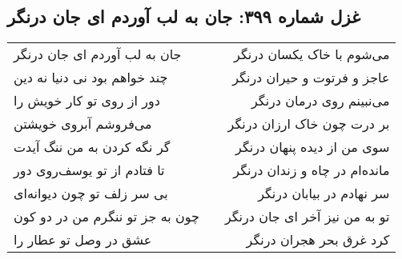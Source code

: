 \begin{center}
\section*{غزل شماره ۳۹۹: جان به لب آوردم ای جان درنگر}
\label{sec:399}
\begin{longtable}{l p{0.5cm} r}
جان به لب آوردم ای جان درنگر
&&
می‌شوم با خاک یکسان درنگر
\\
چند خواهم بود نی دنیا نه دین
&&
عاجز و فرتوت و حیران درنگر
\\
دور از روی تو کار خویش را
&&
می‌نبینم روی درمان درنگر
\\
می‌فروشم آبروی خویشتن
&&
بر درت چون خاک ارزان درنگر
\\
گر نگه کردن به من ننگ آیدت
&&
سوی من از دیده پنهان درنگر
\\
تا فتادم از تو یوسف‌روی دور
&&
مانده‌ام در چاه و زندان درنگر
\\
بی سر زلف تو چون دیوانه‌ای
&&
سر نهادم در بیابان درنگر
\\
چون به جز تو ننگرم من در دو کون
&&
تو به من نیز آخر ای جان درنگر
\\
عشق در وصل تو عطار را
&&
کرد غرق بحر هجران درنگر
\\
\end{longtable}
\end{center}
